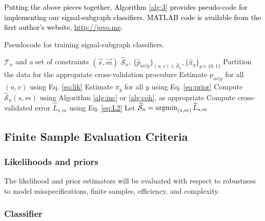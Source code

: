 \documentclass[10pt,journal,cspaper,compsoc]{IEEEtran}
\providecommand{\tk}[1]{\textcolor{black}{#1}}
\newcommand{\argmin}{\operatornamewithlimits{argmin}}
\providecommand{\mc}[1]{\mathcal{#1}}
\providecommand{\mv}[1]{\vec{#1}}
\providecommand{\wh}[1]{\widehat{#1}}
\providecommand{\mhc}[1]{\widehat{\mathcal{#1}}}
\begin{document}
\tk{Putting the above pieces together, Algorithm \ref{alg:3} provides pseudo-code for implementing our signal-subgraph classifiers. MATLAB code is available from the first author's website, \url{http://jovo.me}.}

\begin{algorithm}
\caption{Pseudocode for training signal-subgraph classifiers.}
\label{alg:3}
\begin{algorithmic}[1]
\REQUIRE $\mc{T}_n$ and a set of constraints $(\mv{s},\mv{m})$
\ENSURE $\mhc{S}_n$, $\{\wh{p}_{uv|y}\}_{(u,v) \in \mhc{S}_n}, \{\wh{\pi}_{y}\}_{y \in \{0,1\}}$
\STATE Partition the data for the appropriate cross-validation procedure
\STATE Estimate $p_{uv|y}$ for all $(u,v)$ using Eq. \ref{eq:lik}
\STATE Estimate $\pi_y$ for all $y$ using Eq. \ref{eq:prior}
\FORALL{$(s,m) \in (\mv{s},\mv{m})$}
\STATE Compute $\mhc{S}_n(s,m)$ using Algorithm \ref{alg:inc} or \ref{alg:coh}, as appropriate
\STATE Compute cross-validated error $\wh{L}_{s,m}$ using Eq. \ref{eq:L2}
\ENDFOR
\STATE Let $\mhc{S}_n=\argmin_{(s,m)} \wh{L}_{s,m}$ 
\end{algorithmic}
\end{algorithm}




\subsection{Finite Sample Evaluation Criteria} %
\label{sub:evaluation_criteria}


\subsubsection{Likelihoods and priors} %
\label{ssub:likelihoods_and_priors}

The likelihood and prior estimators will be evaluated with respect to robustness to model misspecifications, finite samples, efficiency, and complexity.




\subsubsection{Classifier} %
\label{ssub:classifier}
\end{document}
